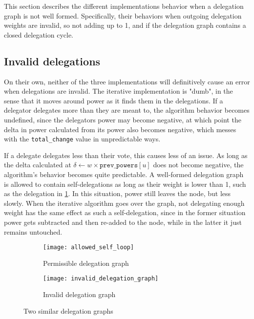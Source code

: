 This section describes the different implementations behavior when a delegation graph is not well formed. Specifically, their behaviors when outgoing delegation weights are invalid, so not adding up to 1, and if the delegation graph contains a closed delegation cycle. 

\subsection{Invalid delegations}

On their own, neither of the three implementations will definitively cause an error when delegations are invalid. The iterative implementation is "dumb", in the sense that it moves around power as it finds them in the delegations. If a delegator delegates more than they are meant to, the algorithm behavior becomes undefined, since the delegators power may become negative, at which point the delta in power calculated from its power also becomes negative, which messes with the \texttt{total\_change} value in unpredictable ways. 

If a delegate delegates less than their vote, this causes less of an issue. As long as the delta calculated at $\delta \gets w \times \texttt{prev\_powers}[u]$ does not become negative, the algorithm's behavior becomes quite predictable. A well-formed delegation graph is allowed to contain self-delegations as long as their weight is lower than 1, such as the delegation in \cref{subfig:permissible-self-delegation}. In this situation, power still leaves the node, but less slowly. When the iterative algorithm goes over the graph, not delegating enough weight has the same effect as such a self-delegation, since in the former situation  power gets subtracted and then re-added to the node, while in the latter it just remains untouched.

\begin{figure}[t]
    \centering
    \begin{subfigure}[t]{0.45\textwidth}
	\centering
	\texttt{[image: allowed\_self\_loop]}
	\caption{Permissible delegation graph}
	\label{subfig:permissible-self-delegation}
    \end{subfigure}
    \hfill
    \begin{subfigure}[t]{0.45\textwidth}
        \centering
        \texttt{[image: invalid\_delegation\_graph]}
        \caption{Invalid delegation graph}
         \label{subfig:invalid-delegation-graph} 
    \end{subfigure}
    \caption{Two similar delegation graphs}
    \label{fig:small-delegation-graphs}
\end{figure}


